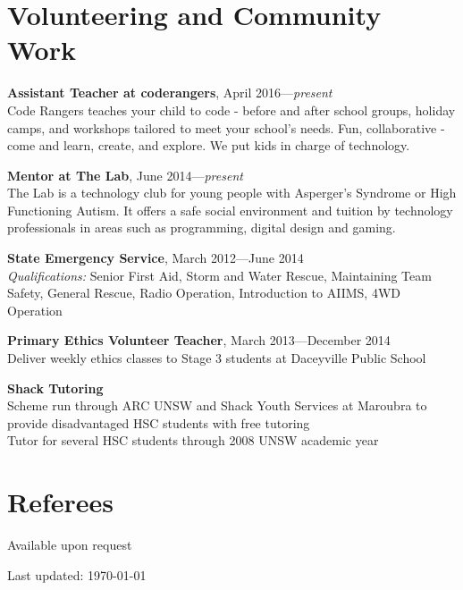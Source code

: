 \documentclass[10pt,a4paper]{article}
\renewenvironment{itemize}{
\begin{list}{}{
\setlength{\leftmargin}{1.5em}
\setlength{\itemsep}{0.25em}
\setlength{\parskip}{0pt}
\setlength{\parsep}{0.25em}
}
}{
\end{list}
}
\begin{document}
\section*{Volunteering and Community Work}
\begin{itemize}
\item \textbf{Assistant Teacher at coderangers}, April 2016---\textit{present}\\
Code Rangers teaches your child to code - before and after school groups, holiday camps, and workshops tailored to meet your school's needs. Fun, collaborative - come and learn, create, and explore. We put kids in charge of technology.

\vspace{0.1cm}
\item \textbf{Mentor at The Lab}, June 2014---\textit{present}\\
The Lab is a technology club for young people with Asperger’s Syndrome 
or High Functioning Autism. It offers a safe social environment and 
tuition by technology professionals in areas such as programming, digital 
design and gaming.

\vspace{0.1cm}
\item \textbf{State Emergency Service}, March 2012---June 2014 \\ 
\textit{Qualifications:} Senior First Aid, Storm and Water Rescue,
Maintaining Team Safety, General Rescue, Radio Operation, Introduction to AIIMS,
4WD Operation  

\vspace{0.1cm}
\item \textbf{Primary Ethics Volunteer Teacher}, March 2013---December 2014\\
Deliver weekly ethics classes to Stage 3 students at Daceyville 
Public School

\vspace{0.1cm}
\item \textbf{Shack Tutoring}\\
Scheme run through ARC UNSW and Shack Youth Services at Maroubra to
provide disadvantaged HSC students with free tutoring\\ 
Tutor for several HSC students through 2008 UNSW academic year
\end{itemize}

\vspace{-0.6cm}
\section*{Referees}

Available upon request

\begin{center}
\begin{small}
Last updated: \today
\end{small}
\end{center}
\end{document}
